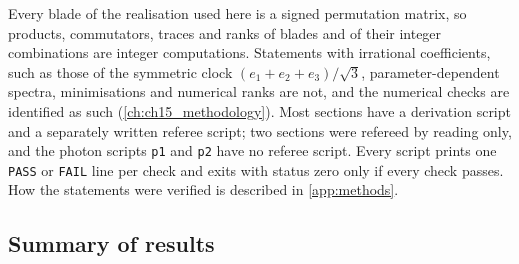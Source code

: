 Every blade of the realisation used here is a signed permutation matrix, so products, commutators, traces and ranks of blades and of their
integer combinations are integer computations. Statements with irrational coefficients, such as those of the symmetric clock
$(e_1+e_2+e_3)/\sqrt3$, parameter-dependent spectra, minimisations and numerical ranks are not, and the numerical checks are identified as such
(\cref{ch:ch15_methodology}). Most sections have a derivation script and a separately written referee script; two sections were refereed by
reading only, and the photon scripts \texttt{p1} and \texttt{p2} have no referee script. Every script prints one \texttt{PASS} or \texttt{FAIL}
line per check and exits with status zero only if every check passes. How the statements were verified is described in \cref{app:methods}.

\subsection{Summary of results}

